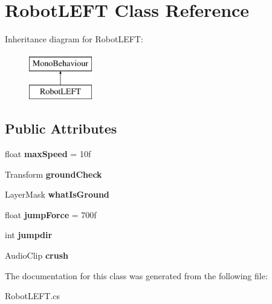 \hypertarget{class_robot_l_e_f_t}{}\section{Robot\+L\+E\+F\+T Class Reference}
\label{class_robot_l_e_f_t}
Inheritance diagram for Robot\+L\+E\+F\+T\+:\begin{figure}[H]
\begin{center}
\leavevmode
\includegraphics[height=2.000000cm]{class_robot_l_e_f_t}
\end{center}
\end{figure}
\subsection*{Public Attributes}
\begin{DoxyCompactItemize}
\item 
\hypertarget{class_robot_l_e_f_t_ab50adc52a29d0feb58e66abcd81d2036}{}float {\bfseries max\+Speed} = 10f\label{class_robot_l_e_f_t_ab50adc52a29d0feb58e66abcd81d2036}

\item 
\hypertarget{class_robot_l_e_f_t_add4b25dbcf5341aa3bd3113aac63c30c}{}Transform {\bfseries ground\+Check}\label{class_robot_l_e_f_t_add4b25dbcf5341aa3bd3113aac63c30c}

\item 
\hypertarget{class_robot_l_e_f_t_a1f338d3efc92bcb00ea70954912b83ef}{}Layer\+Mask {\bfseries what\+Is\+Ground}\label{class_robot_l_e_f_t_a1f338d3efc92bcb00ea70954912b83ef}

\item 
\hypertarget{class_robot_l_e_f_t_a2d0a0a4d8d9430fbbc0555d892d9c20e}{}float {\bfseries jump\+Force} = 700f\label{class_robot_l_e_f_t_a2d0a0a4d8d9430fbbc0555d892d9c20e}

\item 
\hypertarget{class_robot_l_e_f_t_ad6f03773c7872e13ae9a61fde7624c79}{}int {\bfseries jumpdir}\label{class_robot_l_e_f_t_ad6f03773c7872e13ae9a61fde7624c79}

\item 
\hypertarget{class_robot_l_e_f_t_aec8e155a3b82394c81ecb8eeca6ae8b6}{}Audio\+Clip {\bfseries crush}\label{class_robot_l_e_f_t_aec8e155a3b82394c81ecb8eeca6ae8b6}

\end{DoxyCompactItemize}


The documentation for this class was generated from the following file\+:\begin{DoxyCompactItemize}
\item 
Robot\+L\+E\+F\+T.\+cs\end{DoxyCompactItemize}
